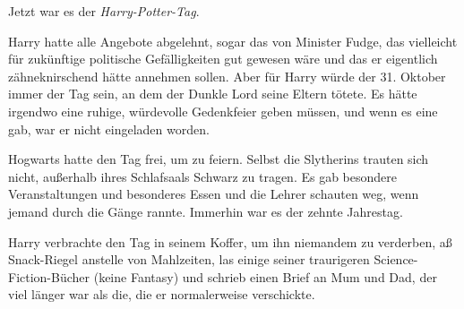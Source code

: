 Jetzt war es der \emph{Harry-Potter-Tag}.

Harry hatte alle Angebote abgelehnt, sogar das von Minister Fudge, das
vielleicht für zukünftige politische Gefälligkeiten gut gewesen wäre und das er
eigentlich zähneknirschend hätte annehmen sollen. Aber für Harry würde der 31.
Oktober immer der Tag sein, an dem der Dunkle Lord seine Eltern tötete. Es hätte
irgendwo eine ruhige, würdevolle Gedenkfeier geben müssen, und wenn es eine gab,
war er nicht eingeladen worden.

Hogwarts hatte den Tag frei, um zu feiern. Selbst die Slytherins trauten sich
nicht, außerhalb ihres Schlafsaals Schwarz zu tragen. Es gab besondere
Veranstaltungen und besonderes Essen und die Lehrer schauten weg, wenn jemand
durch die Gänge rannte. Immerhin war es der zehnte Jahrestag.

Harry verbrachte den Tag in seinem Koffer, um ihn niemandem zu verderben, aß
Snack-Riegel anstelle von Mahlzeiten, las einige seiner traurigeren
Science-Fiction-Bücher (keine Fantasy) und schrieb einen Brief an Mum und Dad,
der viel länger war als die, die er normalerweise verschickte.
